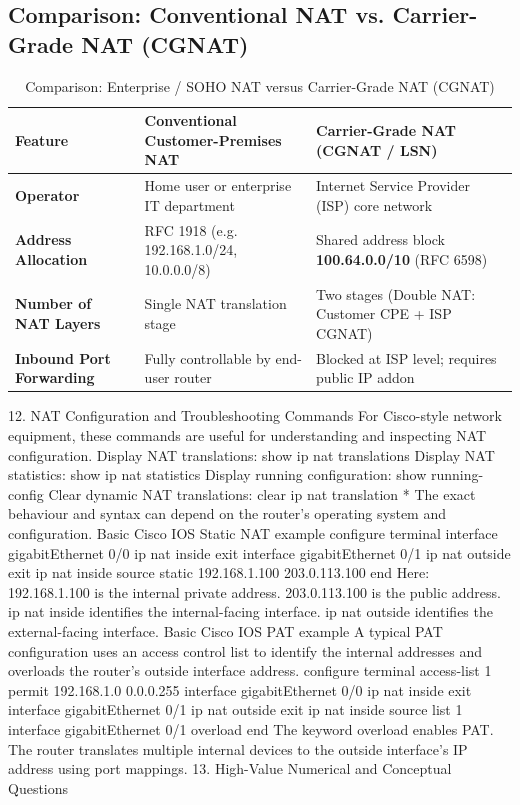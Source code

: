 \subsection{Comparison: Conventional NAT vs. Carrier-Grade NAT (CGNAT)}
\begin{table}[htbp]
\centering
\caption{Comparison: Enterprise / SOHO NAT versus Carrier-Grade NAT (CGNAT)}
\label{tab:cgnat_comparison}
\begin{tabularx}{\textwidth}{p{3.8cm} X X}
\toprule
\textbf{Feature} & \textbf{Conventional Customer-Premises NAT} & \textbf{Carrier-Grade NAT (CGNAT / LSN)} \\
\midrule
\textbf{Operator} & Home user or enterprise IT department & Internet Service Provider (ISP) core network \\
\textbf{Address Allocation} & RFC 1918 (e.g. 192.168.1.0/24, 10.0.0.0/8) & Shared address block \textbf{100.64.0.0/10} (RFC 6598) \\
\textbf{Number of NAT Layers} & Single NAT translation stage & Two stages (Double NAT: Customer CPE + ISP CGNAT) \\
\textbf{Inbound Port Forwarding} & Fully controllable by end-user router & Blocked at ISP level; requires public IP addon \\
\bottomrule
\end{tabularx}
\end{table}
12. NAT Configuration and Troubleshooting Commands
For Cisco-style network equipment, these commands are useful for understanding and inspecting NAT configuration.
Display NAT translations:
show ip nat translations
Display NAT statistics:
show ip nat statistics
Display running configuration:
show running-config
Clear dynamic NAT translations:
clear ip nat translation *
The exact behaviour and syntax can depend on the router's operating system and configuration.
Basic Cisco IOS Static NAT example
configure terminal interface gigabitEthernet 0/0 ip nat inside exit interface gigabitEthernet 0/1 ip nat outside exit ip nat inside source static 192.168.1.100 203.0.113.100 end
Here:
192.168.1.100 is the internal private address.
203.0.113.100 is the public address.
ip nat inside identifies the internal-facing interface.
ip nat outside identifies the external-facing interface.
Basic Cisco IOS PAT example
A typical PAT configuration uses an access control list to identify the internal addresses and overloads the router's outside interface address.
configure terminal access-list 1 permit 192.168.1.0 0.0.0.255 interface gigabitEthernet 0/0 ip nat inside exit interface gigabitEthernet 0/1 ip nat outside exit ip nat inside source list 1 interface gigabitEthernet 0/1 overload end
The keyword overload enables PAT.
The router translates multiple internal devices to the outside interface's IP address using port mappings.
13. High-Value Numerical and Conceptual Questions
